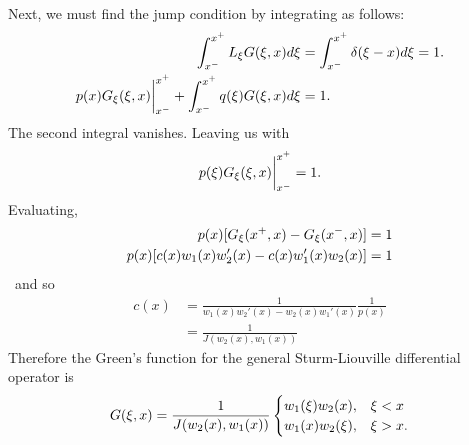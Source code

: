     Next, we must find the jump condition by integrating as follows:
    \begin{equation*}
        \begin{split}
            \int_{x^-}^{x^+} L_\xi G(\xi,x) d\xi &= \int_{x^-}^{x^+} \delta(\xi-x)d\xi = 1.\\
            p(x)G_\xi(\xi,x)\biggr\rvert_{x^-}^{x^+}+\int_{x^-}^{x^+}q(\xi)G(\xi,x)d\xi&=1.
        \end{split}
    \end{equation*}
    The second integral vanishes. Leaving us with
    \begin{equation*}
        p(\xi)G_\xi(\xi,x)\biggr\rvert_{x^-}^{x^+} = 1.
    \end{equation*}
    Evaluating,
    \begin{equation*}
        \begin{split}
            p(x)[G_\xi(x^+,x) - G_\xi(x^-,x)] &= 1\\
            p(x)[c(x)w_1(x)w_2'(x) - c(x)w_1'(x)w_2(x)] &=1\\
        \end{split}
    \end{equation*}\
    and so
    \begin{equation*}
        \begin{split}
            c(x) &= \frac{1}{w_1(x)w_2'(x) - w_2(x)w_1'(x)}\frac{1}{p(x)}\\
            &= \frac{1}{J(w_2(x),w_1(x))}
        \end{split}
    \end{equation*}
    Therefore the Green's function for the general Sturm-Liouville differential operator is 
    \begin{equation*}
        G(\xi,x) = \frac{1}{J(w_2(x),w_1(x))} \begin{cases}
            w_1(\xi)w_2(x), &\xi < x\\
            w_1(x)w_2(\xi), &\xi > x.
        \end{cases}
    \end{equation*}
